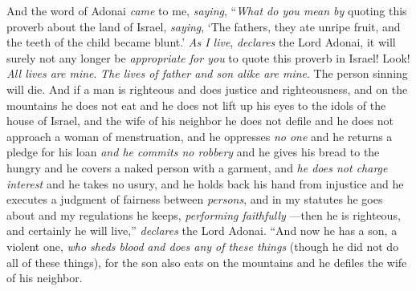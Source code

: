 \begin{biblechapter} %
 And the word of Adonai \textit{came} to me, \textit{saying},
\verse “\textit{What do you mean by} quoting this proverb about the land of Israel, \textit{saying}, ‘The fathers, they ate unripe fruit, and the teeth of the child became blunt.’
\verse \textit{As I live}, \textit{declares} the Lord Adonai, it will surely not any longer be \textit{appropriate for you} to quote this proverb in Israel!
\verse Look! \textit{All lives are mine}. \textit{The lives of father and son alike are mine}. The person sinning will die.
\verse And if a man is righteous and does justice and righteousness,
\verse and on the mountains he does not eat and he does not lift up his eyes to the idols of the house of Israel, and the wife of his neighbor he does not defile and he does not approach a woman of menstruation,
\verse and he oppresses \textit{no one} and he returns a pledge for his loan \textit{and he commits no robbery} and he gives his bread to the hungry and he covers a naked person with a garment,
\verse and \textit{he does not charge interest} and he takes no usury, and he holds back his hand from injustice and he executes a judgment of fairness between \textit{persons},
\verse and in my statutes he goes about and my regulations he keeps, \textit{performing faithfully} —then he is righteous, and certainly he will live,” \textit{declares} the Lord Adonai.
\verse “And now he has a son, a violent one, \textit{who sheds blood} \textit{and does any of these things}
\verse (though he did not do all of these things), for the son also eats on the mountains and he defiles the wife of his neighbor.

\end{biblechapter}
